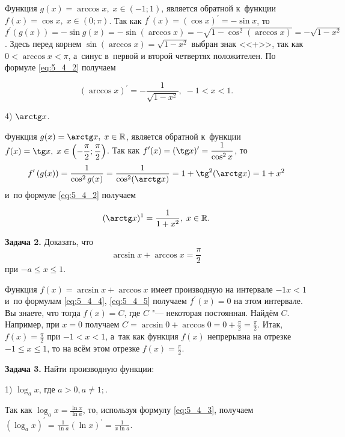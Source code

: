 Функция $g(x) = \arccos x, \; x \in (-1; 1)$, является обратной к~функции
$f(x) = \cos x, \; x \in (0; \pi)$. Так как
$f^\prime (x) = (\cos x)^\prime = -\sin x$, то
$f^\prime \left( g(x) \right) = -\sin g(x) = -\sin (\arccos x) =
-\sqrt{1 - \cos^{2} (\arccos x)} = -\sqrt{1 - x^{2}}$.
Здесь перед корнем $\sin (\arccos x) = \sqrt{1 - x^{2}}$ выбран знак <<+>>,
так как $0 < \arccos x < \pi$, а~синус в~первой и второй четвертях положителен.
По формуле \eqref{eq:5_4_2} получаем

\begin{equation}\label{eq:5_4_5}
\displaystyle (\arccos x)^\prime = -\frac{1}{\sqrt{1 - x^{2}}}, \; -1 < x < 1.
\end{equation}

4) $\arctg x$.

Функция $g(x) = \arctg x, \; x \in \mathbb{R}$, является обратной к~функции
$\displaystyle f(x) = \tg x, \; x \in \left( -\frac{\pi}{2}; \frac{\pi}{2} \right)$.
Так как $\displaystyle f^\prime (x) = (\tg x)^\prime = \frac{1}{\cos^{2} x}$, то
$$\displaystyle f^\prime \left( g(x) \right) = \frac{1}{\cos^{2} g(x)} =
\frac{1}{\cos^{2} (\arctg x)} = 1 + \tg^{2} (\arctg x) = 1 + x^{2}$$
и~по формуле \eqref{eq:5_4_2} получаем

\begin{equation}
\displaystyle (\arctg x)^{1} = \frac{1}{1 + x^{2}}, \; x \in \mathbb{R}.
\end{equation}

\textbf{Задача 2.}\label{ex:5_4_2} Доказать, что
$$\displaystyle \arcsin x + \arccos x = \frac{\pi}{2}$$
при $-a \leqslant x \leqslant 1$.

Функция $f(x) = \arcsin x + \arccos x$ имеет производную на интервале $-1 x < 1$
и~по формулам \eqref{eq:5_4_4}, \eqref{eq:5_4_5} получаем $f^\prime (x) = 0$
на этом интервале. Вы знаете, что тогда $f(x) = C$, где $C$ "--- некоторая постоянная.
Найдём $C$.  Например, при $x = 0$ получаем
$\displaystyle C = \arcsin 0 + \arccos 0 = 0 + \frac{\pi}{2} = \frac{\pi}{2}$.
Итак, $\displaystyle f(x) = \frac{\pi}{2}$ при $-1 < x < 1$,
а~так как функция $f(x)$ непрерывна на отрезке $-1 \leqslant x \leqslant 1$,
то на всём этом отрезке $\displaystyle f(x) = \frac{\pi}{2}$.

\textbf{Задача 3.}\label{ex:5_4_3} Найти производную функции:

1) $\log_{a} x$, где $a > 0, a \ne 1;$.

Так как $\displaystyle \log_{a} x = \frac{\ln x}{\ln a}$, то, используя формулу
\eqref{eq:5_4_3}, получаем
$\displaystyle (\log_{a} x)^\prime = \frac{1}{\ln a}(\ln x)^\prime = \frac{1}{x \ln a}$.

